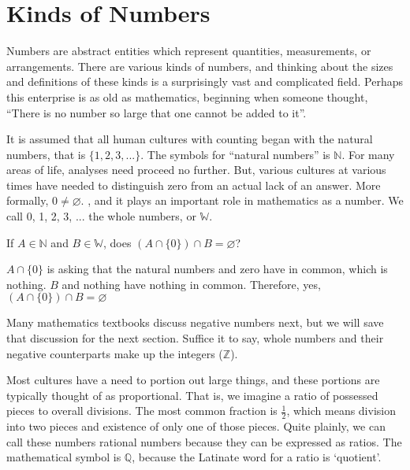 
\section{Kinds of Numbers}\label{sec:AAKinds}



Numbers are abstract entities which represent quantities, measurements, or arrangements.  
There are various kinds of numbers, and thinking about the sizes and definitions of these
kinds is a surprisingly vast and complicated field.  Perhaps this enterprise is as old as 
mathematics, beginning when someone thought, ``There is no number so large that
one cannot be added to it''. 

It is assumed that all human cultures with counting began with the \gls{natural numbers}, 
that is $\{1, 2, 3, ...  \}$.  The symbols for ``natural numbers'' is $\mathbb{N}$.  For many areas of life,
analyses need proceed no further.  But, various cultures at various times have needed to 
distinguish zero from an actual lack of an answer.  More formally, $0 \ne \varnothing$.
, and it plays an important role in mathematics as a number.  We call
0, 1, 2, 3, ... the whole numbers, or $\mathbb{W}$. 


\begin{example}
\exProblem
If $A \in \mathbb{N}$ and $B \in \mathbb{W}$, does $(A \cap \{0\} ) \cap B = \varnothing$?

\exSolution
$A \cap \{0\}$ is asking that the natural numbers and zero have in common, which is nothing.
$B$ and nothing have nothing in common.  Therefore, yes, $(A \cap \{0\} ) \cap B = \varnothing$
\end{example}


Many mathematics textbooks discuss negative numbers next, but we will save that discussion
for the next section.  Suffice it to say, whole numbers and their negative counterparts make up
the \gls{integers} ($\mathbb{Z}$).

Most cultures have a need to portion out large things, and these portions are typically thought of
as proportional.  That is, we imagine a ratio of possessed pieces to overall divisions.  The most
common fraction is $\frac{1}{2}$, which means division into two pieces and existence of only one
of those pieces.  Quite plainly, we can call these numbers \gls{rational numbers} because they 
can be expressed as ratios.  The mathematical symbol is $\mathbb{Q}$, because the Latinate
word for a ratio is `quotient'.


